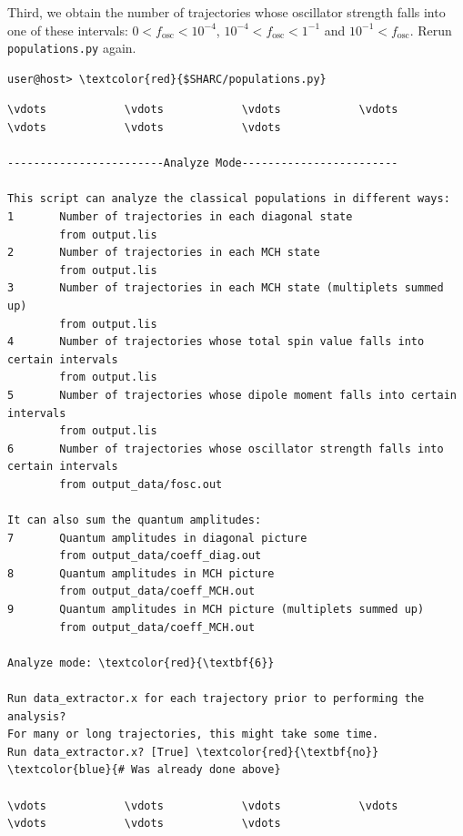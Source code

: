 \documentclass[a4paper,11pt,DIV=15,openany]{scrbook}
\newcommand{\ttt}[1]{\texttt{#1}}
\begin{document}
\normalsize
Third, we obtain the number of trajectories whose oscillator strength falls into one of these intervals: $0<f_\text{osc}<10^{-4}$, $10^{-4}<f_\text{osc}<1^{-1}$ and $10^{-1}<f_\text{osc}$. Rerun \ttt{populations.py} again.
\begin{Verbatim}[commandchars=\\\{\}]
user@host> \textcolor{red}{$SHARC/populations.py}
\end{Verbatim}

\begin{oframed}
\footnotesize\begin{Verbatim}[commandchars=\\\{\}]
\vdots            \vdots            \vdots            \vdots            \vdots            \vdots            \vdots            

------------------------Analyze Mode------------------------

This script can analyze the classical populations in different ways:
1       Number of trajectories in each diagonal state                                   
        from output.lis
2       Number of trajectories in each MCH state                                        
        from output.lis
3       Number of trajectories in each MCH state (multiplets summed up)                 
        from output.lis
4       Number of trajectories whose total spin value falls into certain intervals      
        from output.lis
5       Number of trajectories whose dipole moment falls into certain intervals         
        from output.lis
6       Number of trajectories whose oscillator strength falls into certain intervals   
        from output_data/fosc.out

It can also sum the quantum amplitudes:
7       Quantum amplitudes in diagonal picture                                          
        from output_data/coeff_diag.out
8       Quantum amplitudes in MCH picture                                               
        from output_data/coeff_MCH.out
9       Quantum amplitudes in MCH picture (multiplets summed up)                        
        from output_data/coeff_MCH.out

Analyze mode: \textcolor{red}{\textbf{6}}

Run data_extractor.x for each trajectory prior to performing the analysis?
For many or long trajectories, this might take some time.
Run data_extractor.x? [True] \textcolor{red}{\textbf{no}}          \textcolor{blue}{# Was already done above}

\vdots            \vdots            \vdots            \vdots            \vdots            \vdots            \vdots            


\end{Verbatim}
\end{oframed}
\end{document}
